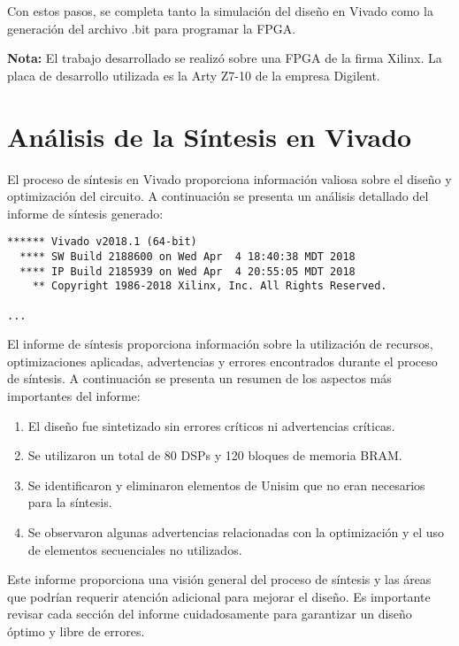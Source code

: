 \documentclass[12pt,a4paper, twoside]{article} %
\begin{document}
Con estos pasos, se completa tanto la simulación del diseño en Vivado como la generación del archivo .bit para programar la FPGA.

\textbf{Nota:} El trabajo desarrollado se realizó sobre una FPGA de la firma Xilinx. La placa de desarrollo utilizada es la Arty Z7-10 de la empresa Digilent.

\newpage

\section{Análisis de la Síntesis en Vivado}

El proceso de síntesis en Vivado proporciona información valiosa sobre el diseño y optimización del circuito. A continuación se presenta un análisis detallado del informe de síntesis generado:

\begin{lstlisting}[basicstyle=\small\ttfamily]
****** Vivado v2018.1 (64-bit)
  **** SW Build 2188600 on Wed Apr  4 18:40:38 MDT 2018
  **** IP Build 2185939 on Wed Apr  4 20:55:05 MDT 2018
    ** Copyright 1986-2018 Xilinx, Inc. All Rights Reserved.

...
\end{lstlisting}

El informe de síntesis proporciona información sobre la utilización de recursos, optimizaciones aplicadas, advertencias y errores encontrados durante el proceso de síntesis. A continuación se presenta un resumen de los aspectos más importantes del informe:

\begin{enumerate}
    \item El diseño fue sintetizado sin errores críticos ni advertencias críticas.
    \item Se utilizaron un total de 80 DSPs y 120 bloques de memoria BRAM.
    \item Se identificaron y eliminaron elementos de Unisim que no eran necesarios para la síntesis.
    \item Se observaron algunas advertencias relacionadas con la optimización y el uso de elementos secuenciales no utilizados.
\end{enumerate}

Este informe proporciona una visión general del proceso de síntesis y las áreas que podrían requerir atención adicional para mejorar el diseño. Es importante revisar cada sección del informe cuidadosamente para garantizar un diseño óptimo y libre de errores.
\end{document}

